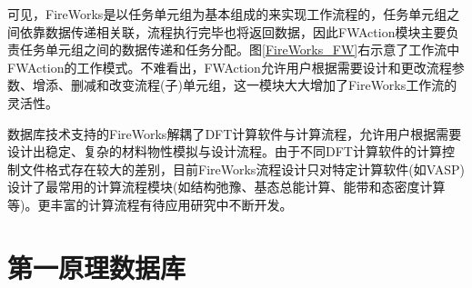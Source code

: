 {可见，\textrm{FireWorks}是以任务单元组为基本组成的来实现工作流程的，任务单元组之间依靠数据传递相关联，流程执行完毕也将返回数据，因此\textrm{FWAction}模块主要负责任务单元组之间的数据传递和任务分配。图\ref{FireWorks_FW}右示意了工作流中\textrm{FWAction}的工作模式。不难看出，\textrm{FWAction}允许用户根据需要设计和更改流程参数、增添、删减和改变流程(子)单元组，这一模块大大增加了\textrm{FireWorks}工作流的灵活性。

数据库技术支持的\textrm{FireWorks}解耦了\textrm{DFT}计算软件与计算流程，允许用户根据需要设计出稳定、复杂的材料物性模拟与设计流程。由于不同\textrm{DFT}计算软件的计算控制文件格式存在较大的差别，目前\textrm{FireWorks}流程设计只对特定计算软件(如\textrm{VASP})设计了最常用的计算流程模块(如结构弛豫、基态总能计算、能带和态密度计算等)。更丰富的计算流程有待应用研究中不断开发。
}

\section{第一原理数据库}
\frame
